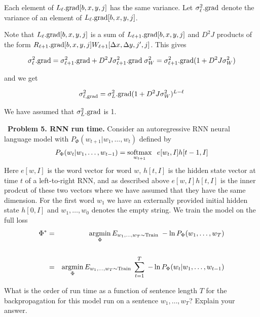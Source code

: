 \documentclass{article}
\newcommand{\solution}[1]{}
\begin{document}
{{Each element of $L_\ell.\mathrm{grad}[b,x,y,j]$ has the same variance. Let $\sigma^2_\ell.\mathrm{grad}$ denote the variance of an element of $L_\ell.\mathrm{grad}[b,x,y,j]$.

Note that $L_\ell.\mathrm{grad}[b,x,y,j]$ is a sum of $L_{\ell+1}.\mathrm{grad}[b,x,y,j]$ and $D^2J$ products of the form
$R_{\ell+1}.\mathrm{grad}[b,x,y,j] W_{\ell+1}[\Delta x, \Delta y, j',j]$.  This gives

$$\sigma_\ell^2.\mathrm{grad} = \sigma^2_{\ell+1}.\mathrm{grad} + D^2J\sigma^2_{\ell+1}.\mathrm{grad}\;\sigma^2_W = \sigma^2_{\ell+1}.\mathrm{grad}(1 + D^2J\sigma^2_W)$$

and we get

$$\sigma^2_{\ell,\mathrm{grad}} = \sigma^2_L.\mathrm{grad}(1 + D^2J\sigma^2_W)^{L-\ell}$$

We have assumed that $\sigma^2_L.\mathrm{grad}$ is 1.
}
}

\bigskip
~{\bf Problem 5. RNN run time.}  Consider an autoregressive RNN neural language model with $P_\Phi(w_{t+1}|w_1,\ldots,w_t)$ defined by
$$P_\Phi(w_t| w_1,\ldots,w_{t-1}) = \operatorname*{softmax}_{w_{t+1}}\;\;e[w_t,I]h[t-1,I]$$
Here $e[w,I]$ is the word vector for word $w$, $h[t,I]$ is the hidden state vector at time $t$ of a left-to-right RNN, and as described above $e[w,I]h[t,I]$
is the inner prodcut of these two vectors where we have assumed that they have the same dimension.
For the first word $w_1$ we have an externally provided initial hidden state $h[0,I]$ and $w_1,\ldots,w_0$ denotes the empty string.
We train the model on the full loss
\begin{eqnarray*}
  \Phi^* &  = & \operatorname*{argmin}_\Phi E_{w_1,\ldots,w_T \sim \mathrm{Train}}\;-\ln P_\Phi(w_1,\ldots,w_T) \\
  \\
  & = & \operatorname*{argmin}_\Phi E_{w_1,\ldots,w_T \sim \mathrm{Train}}\;\sum_{t=1}^T\;-\ln P_\Phi(w_t|w_1,\ldots,w_{t-1})
\end{eqnarray*}

\medskip
What is the order of run time as a function of sentence length $T$ for the backpropagation for this model
run on a sentence $w_1,\ldots,w_T$?  Explain your answer.

\solution{
  The backprogation takes $O(T)$ time (not $O(T^2)$). The model consists of $O(T)$ objects each of which performs a single forward operation and a single backward operation.
  As the backpropagation procedes more of the loss terms in the sum over $t$ get incorporated.  It should be noted that RNNs take time linear in the
  sequence length even on parallel hardware.  The transformer, on the other hand, takes constant time in parallel independent of the length of the sequence.  This is
  a major advantage of the transformer.
}
\end{document}
